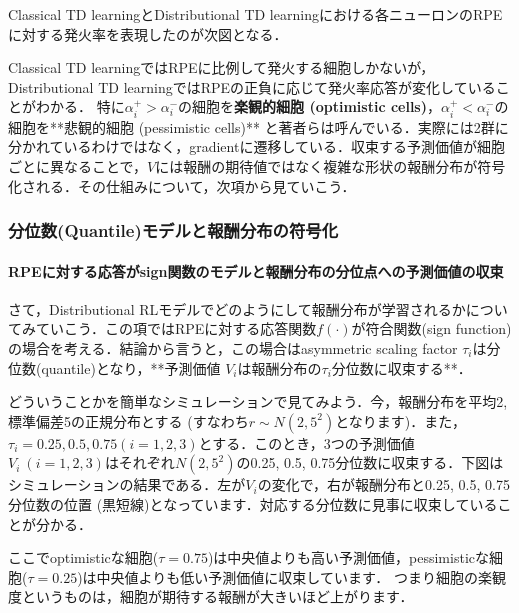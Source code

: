 Classical TD learningとDistributional TD learningにおける各ニューロンのRPEに対する発火率を表現したのが次図となる．



Classical TD learningではRPEに比例して発火する細胞しかないが，Distributional TD learningではRPEの正負に応じて発火率応答が変化していることがわかる． 特に$\alpha_{i}^{+} \gt \alpha_{i}^{-}$の細胞を\textbf{楽観的細胞 (optimistic cells)}，$\alpha_{i}^{+}\lt
\alpha_{i}^{-}$の細胞を**悲観的細胞 (pessimistic
cells)** と著者らは呼んでいる．実際には2群に分かれているわけではなく，gradientに遷移している．収束する予測価値が細胞ごとに異なることで，$V$には報酬の期待値ではなく複雑な形状の報酬分布が符号化される．その仕組みについて，次項から見ていこう．
\subsubsection{分位数(Quantile)モデルと報酬分布の符号化}

\paragraph{RPEに対する応答がsign関数のモデルと報酬分布の分位点への予測価値の収束}
さて，Distributional RLモデルでどのようにして報酬分布が学習されるかについてみていこう．この項ではRPEに対する応答関数$f(\cdot)$が符合関数(sign function)の場合を考える．結論から言うと，この場合はasymmetric scaling factor $\tau_i$は分位数(quantile)となり，**予測価値
$V_i$は報酬分布の$\tau_i$分位数に収束する**．
    
どういうことかを簡単なシミュレーションで見てみよう．今，報酬分布を平均2, 標準偏差5の正規分布とする (すなわち$r \sim N(2, 5^2)$となります)．また，$\tau_i = 0.25, 0.5, 0.75 (i=1,2,3)$とする．このとき，3つの予測価値 $V_i \ (i=1,2,3)$はそれぞれ$N(2, 5^2)$の0.25, 0.5,
0.75分位数に収束する．下図はシミュレーションの結果である．左が$V_i$の変化で，右が報酬分布と0.25, 0.5, 0.75分位数の位置 (黒短線)となっています．対応する分位数に見事に収束していることが分かる．








ここでoptimisticな細胞($\tau=0.75$)は中央値よりも高い予測価値，pessimisticな細胞($\tau=0.25$)は中央値よりも低い予測価値に収束しています． つまり細胞の楽観度というものは，細胞が期待する報酬が大きいほど上がります．

